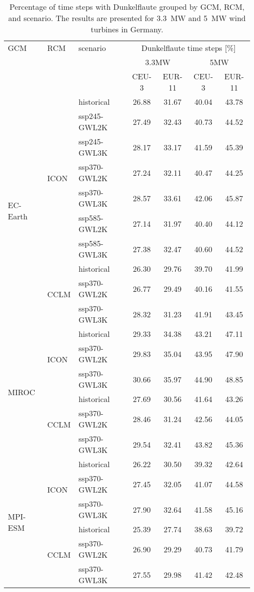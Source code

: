 \begin{table}[!htbp]
\centering
\caption{Percentage of time steps with Dunkelflaute grouped by GCM, RCM, and scenario. The results are presented for \qty{3.3}{\mega\watt} and \qty{5}{\mega\watt} wind turbines in Germany.}
\label{Table:Dunkelflaute_changes}
\begin{tabular}{lll|cc|cc}
\toprule
GCM & RCM & scenario & \multicolumn{4}{c}{Dunkelflaute time steps [\%]} \\
 & & & \multicolumn{2}{c}{3.3\si{\mega\watt}} & \multicolumn{2}{c}{5\si{\mega\watt}} \\
 & & & CEU-3 & EUR-11 & CEU-3 & EUR-11 \\
\midrule
\cmidrule(lr){1-7}
\multirow{10}{*}{EC-Earth} & \multirow{7}{*}{ICON} & historical & 26.88 & 31.67 & 40.04 & 43.78 \\
 &  & ssp245-GWL2K & 27.49 & 32.43 & 40.73 & 44.52 \\
 &  & ssp245-GWL3K & 28.17 & 33.17 & 41.59 & 45.39 \\
 &  & ssp370-GWL2K & 27.24 & 32.11 & 40.47 & 44.25 \\
 &  & ssp370-GWL3K & 28.57 & 33.61 & 42.06 & 45.87 \\
 &  & ssp585-GWL2K & 27.14 & 31.97 & 40.40 & 44.12 \\
 &  & ssp585-GWL3K & 27.38 & 32.47 & 40.60 & 44.52 \\
\cmidrule(lr){2-7}
 & \multirow{3}{*}{CCLM} & historical & 26.30 & 29.76 & 39.70 & 41.99 \\
 &  & ssp370-GWL2K & 26.77 & 29.49 & 40.16 & 41.55 \\
 &  & ssp370-GWL3K & 28.32 & 31.23 & 41.91 & 43.45 \\
\cmidrule(lr){2-7}
\multirow{6}{*}{MIROC} & \multirow{3}{*}{ICON} & historical & 29.33 & 34.38 & 43.21 & 47.11 \\
 &  & ssp370-GWL2K & 29.83 & 35.04 & 43.95 & 47.90 \\
 &  & ssp370-GWL3K & 30.66 & 35.97 & 44.90 & 48.85 \\
\cmidrule(lr){2-7}
 & \multirow{3}{*}{CCLM} & historical & 27.69 & 30.56 & 41.64 & 43.26 \\
 &  & ssp370-GWL2K & 28.46 & 31.24 & 42.56 & 44.05 \\
 &  & ssp370-GWL3K & 29.54 & 32.41 & 43.82 & 45.36 \\
\cmidrule(lr){2-7}
\multirow{6}{*}{MPI-ESM} & \multirow{3}{*}{ICON} & historical & 26.22 & 30.50 & 39.32 & 42.64 \\
 &  & ssp370-GWL2K & 27.45 & 32.05 & 41.07 & 44.58 \\
 &  & ssp370-GWL3K & 27.90 & 32.64 & 41.58 & 45.16 \\
\cmidrule(lr){2-7}
 & \multirow{3}{*}{CCLM} & historical & 25.39 & 27.74 & 38.63 & 39.72 \\
 &  & ssp370-GWL2K & 26.90 & 29.29 & 40.73 & 41.79 \\
 &  & ssp370-GWL3K & 27.55 & 29.98 & 41.42 & 42.48 \\
\bottomrule
\end{tabular}
\end{table}